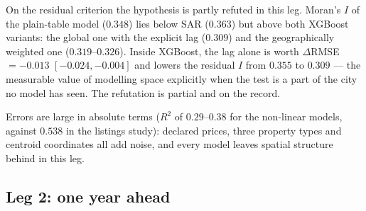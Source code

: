 \documentclass[11pt,a4paper]{article}
\begin{document}
On the residual criterion the hypothesis is partly refuted in this leg. Moran's $I$ of the
plain-table model ($0.348$) lies below SAR ($0.363$) but above both XGBoost variants: the global
one with the explicit lag ($0.309$) and the geographically weighted one ($0.319$--$0.326$).
Inside XGBoost, the lag alone is worth $\Delta$RMSE $= -0.013$ $[-0.024, -0.004]$ and lowers the
residual $I$ from $0.355$ to $0.309$ --- the measurable value of modelling space explicitly when
the test is a part of the city no model has seen. The refutation is partial and on the record.

Errors are large in absolute terms ($R^2$ of $0.29$--$0.38$ for the non-linear models, against
$0.538$ in the listings
study): declared prices, three property types and centroid coordinates all add noise, and every
model leaves spatial structure behind in this leg.

\subsection{Leg 2: one year ahead}
\end{document}
